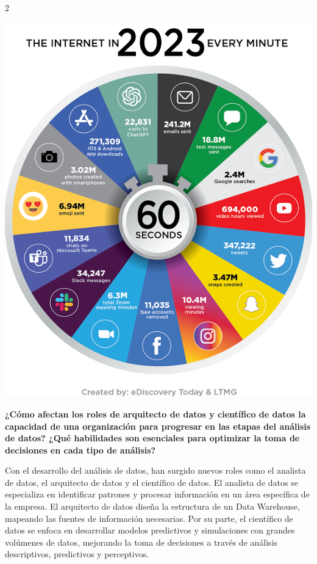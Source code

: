 \documentclass[12pt,spanish,Letterpaper,openany]{book}
\begin{document}
\begin {multicols}{2}
\begin {flushleft}
\begin{minipage}[c]{\columnwidth}
\begin{center}\includegraphics[width=1\linewidth]{imagenes_articulos/spricardo_01} \end{center}

\end{minipage}
\end {flushleft}

\textbf{¿Cómo afectan los roles de arquitecto de datos y científico de datos la capacidad de una organización para progresar en las etapas del análisis de datos? ¿Qué habilidades son esenciales para optimizar la toma de decisiones en cada tipo de análisis?}

Con el desarrollo del análisis de datos, han surgido nuevos roles como el analista de datos, el arquitecto de datos y el científico de datos. El analista de datos se especializa en identificar patrones y procesar información en un área específica de la empresa. El arquitecto de datos diseña la estructura de un Data Warehouse, mapeando las fuentes de información necesarias. Por su parte, el científico de datos se enfoca en desarrollar modelos predictivos y simulaciones con grandes volúmenes de datos, mejorando la toma de decisiones a través de análisis descriptivos, predictivos y perceptivos.


\end{multicols}
\end{document}
